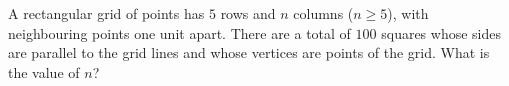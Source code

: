 A rectangular grid of points has \(5\) rows and \(n\) columns (\(n\ge5\)), with neighbouring points one unit apart. There are a total of \(100\) squares whose sides are parallel to the grid lines and whose vertices are points of the grid. What is the value of \(n\)?
